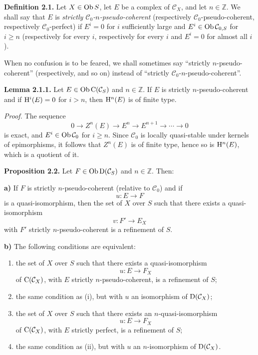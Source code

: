 \documentclass[11pt]{article}
\begin{document}
\textbf{Definition 2.1.} Let \(X\in\operatorname{Ob} S\), let \(E\) be a complex of \(\mathcal C_X\), and let \(n\in\mathbb Z\). We shall say that \(E\) is \emph{strictly \(\mathcal C_0\)-\(n\)-pseudo-coherent} (respectively \(\mathcal C_0\)-pseudo-coherent, respectively \(\mathcal C_0\)-perfect) if \(E^i=0\) for \(i\) sufficiently large and \(E^i\in\operatorname{Ob}\mathcal C_{0,S}\) for \(i\geq n\) (respectively for every \(i\), respectively for every \(i\) and \(E^i=0\) for almost all \(i\)).

When no confusion is to be feared, we shall sometimes say ``strictly \(n\)-pseudo-coherent'' (respectively, and so on) instead of ``strictly \(\mathcal C_0\)-\(n\)-pseudo-coherent''.

\textbf{Lemma 2.1.1.} Let \(E\in\operatorname{Ob}\mathrm C(\mathcal C_S)\) and \(n\in\mathbb Z\). If \(E\) is strictly \(n\)-pseudo-coherent and if \(\mathrm H^i(E)=0\) for \(i>n\), then \(\mathrm H^n(E)\) is of finite type.

\emph{Proof.} The sequence
\[
  0\longrightarrow Z^n(E)\longrightarrow E^n\longrightarrow E^{n+1}\longrightarrow\cdots\longrightarrow 0
\]
is exact, and \(E^i\in\operatorname{Ob}\mathcal C_0\) for \(i\geq n\). Since \(\mathcal C_0\) is locally quasi-stable under kernels of epimorphisms, it follows that \(Z^n(E)\) is of finite type, hence so is \(\mathrm H^n(E)\), which is a quotient of it.

\textbf{Proposition 2.2.} Let \(F\in\operatorname{Ob}\mathrm D(\mathcal C_S)\) and \(n\in\mathbb Z\). Then:

\textbf{a)} If \(F\) is strictly \(n\)-pseudo-coherent (relative to \(\mathcal C_0\)) and if
\[
  u:E\longrightarrow F
\]
is a quasi-isomorphism, then the set of \(X\) over \(S\) such that there exists a quasi-isomorphism
\[
  v:F'\longrightarrow E_X
\]
with \(F'\) strictly \(n\)-pseudo-coherent is a refinement of \(S\).

\textbf{b)} The following conditions are equivalent:
\begin{enumerate}[label=(\roman*)]
\item the set of \(X\) over \(S\) such that there exists a quasi-isomorphism
\[
  u:E\longrightarrow F_X
\]
of \(\mathrm C(\mathcal C_X)\), with \(E\) strictly \(n\)-pseudo-coherent, is a refinement of \(S\);
\item[\((\mathrm{i}')\)] the same condition as (i), but with \(u\) an isomorphism of \(\mathrm D(\mathcal C_X)\);
\item the set of \(X\) over \(S\) such that there exists an \(n\)-quasi-isomorphism
\[
  u:E\longrightarrow F_X
\]
of \(\mathrm C(\mathcal C_X)\), with \(E\) strictly perfect, is a refinement of \(S\);
\item[\((\mathrm{ii}')\)] the same condition as (ii), but with \(u\) an \(n\)-isomorphism of \(\mathrm D(\mathcal C_X)\).
\end{enumerate}
\end{document}

